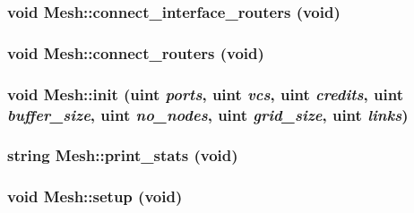 \hypertarget{classMesh_0bee0b7a3c9b621524748a97a3575db7}{
\subsubsection[{connect\_\-interface\_\-routers}]{\setlength{\rightskip}{0pt plus 5cm}void Mesh::connect\_\-interface\_\-routers (void)}}
\label{classMesh_0bee0b7a3c9b621524748a97a3575db7}


\hypertarget{classMesh_fea2e233774ea469b02cff87afc336bc}{
\subsubsection[{connect\_\-routers}]{\setlength{\rightskip}{0pt plus 5cm}void Mesh::connect\_\-routers (void)}}
\label{classMesh_fea2e233774ea469b02cff87afc336bc}


\hypertarget{classMesh_678dc93df5115714b2d2e9a5932692db}{
\subsubsection[{init}]{\setlength{\rightskip}{0pt plus 5cm}void Mesh::init ({\bf uint} {\em ports}, \/  {\bf uint} {\em vcs}, \/  {\bf uint} {\em credits}, \/  {\bf uint} {\em buffer\_\-size}, \/  {\bf uint} {\em no\_\-nodes}, \/  {\bf uint} {\em grid\_\-size}, \/  {\bf uint} {\em links})}}
\label{classMesh_678dc93df5115714b2d2e9a5932692db}


\hypertarget{classMesh_eea84429f858784c6232e5633603fdf8}{
\subsubsection[{print\_\-stats}]{\setlength{\rightskip}{0pt plus 5cm}string Mesh::print\_\-stats (void)}}
\label{classMesh_eea84429f858784c6232e5633603fdf8}


\hypertarget{classMesh_5c83ba3ef93b8ab63084b9c45082c7e9}{
\subsubsection[{setup}]{\setlength{\rightskip}{0pt plus 5cm}void Mesh::setup (void)}}
\label{classMesh_5c83ba3ef93b8ab63084b9c45082c7e9}




